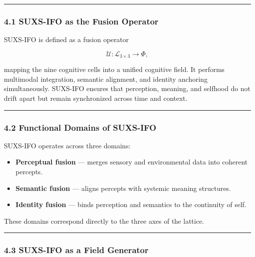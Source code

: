 \begin{center}\rule{0.5\linewidth}{0.5pt}\end{center}

\subsubsection{4.1 SUXS-IFO as the Fusion Operator}\label{suxs-ifo-as-the-fusion-operator}

SUXS-IFO is defined as a fusion operator

\[
\mathcal{U} : \mathcal{L}_{3 \times 3} \rightarrow \Phi,
\]

mapping the nine cognitive cells into a unified cognitive field. It performs multimodal integration, semantic alignment, and identity anchoring simultaneously. SUXS-IFO ensures that perception, meaning, and selfhood do not drift apart but remain synchronized across time and context.

\begin{center}\rule{0.5\linewidth}{0.5pt}\end{center}

\subsubsection{4.2 Functional Domains of SUXS-IFO}\label{functional-domains-of-suxs-ifo}

SUXS-IFO operates across three domains:

\begin{itemize}
\tightlist
\item
  \textbf{Perceptual fusion} --- merges sensory and environmental data into coherent percepts.\\
\item
  \textbf{Semantic fusion} --- aligns percepts with systemic meaning structures.\\
\item
  \textbf{Identity fusion} --- binds perception and semantics to the continuity of self.
\end{itemize}

These domains correspond directly to the three axes of the lattice.

\begin{center}\rule{0.5\linewidth}{0.5pt}\end{center}

\subsubsection{4.3 SUXS-IFO as a Field Generator}\label{suxs-ifo-as-a-field-generator}


